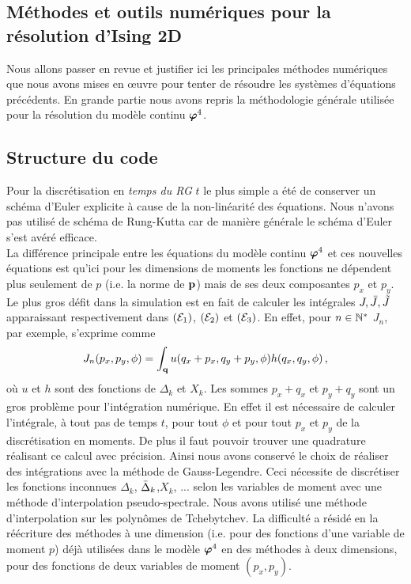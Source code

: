 \documentclass[10.5pt]{article}
\begin{document}
\begin{multicols}{2}
\section{Méthodes et outils numériques pour la résolution d'Ising 2D}

\label{sec:NumIsing}
Nous allons passer en revue et justifier ici les principales méthodes numériques que nous avons mises en œuvre pour tenter de résoudre les systèmes d'équations précédents. En grande partie nous avons repris la méthodologie générale utilisée pour la résolution du modèle continu $\boldsymbol{ \varphi}^4$.


\subsection{Structure du code}

Pour la discrétisation en \textit{temps du RG} $t$ le plus simple a été de conserver un schéma d'Euler explicite à cause de la non-linéarité des équations. Nous n'avons pas utilisé de schéma de Rung-Kutta car de manière générale le schéma d'Euler s'est avéré efficace.\\

La différence principale entre les équations du modèle continu $\boldsymbol{ \varphi}^4$ et ces nouvelles équations est qu'ici pour les dimensions de moments les fonctions ne dépendent plus seulement de $p$ (i.e. la norme de ${\bf p}$) mais de ses deux composantes $p_x$ et $p_y$. Le plus gros défit dans la simulation est en fait de calculer les intégrales $J, \bar{J}, \tilde{J}$ apparaissant respectivement dans $(\mathcal{E}_1)$, $(\mathcal{E}_2)$ et $(\mathcal{E}_3)$. En effet, pour $n\in\mathbb{N}^*$ $J_n$, par exemple, s'exprime comme 
\begin{equation}
	J_n(p_x, p_y, \phi) = \int_{\bf q} u(q_x+p_x, q_y+p_y, \phi) h(q_x,q_y, \phi) \, ,
\end{equation}
où $u$ et $h$ sont des fonctions de $\Delta_k$ et $X_k$. Les sommes $p_x+q_x$ et $p_y+q_y$ sont un gros problème pour l'intégration numérique. En effet il est nécessaire de calculer l'intégrale, à tout pas de temps $t$, pour tout $\phi$ et pour tout $p_x$ et $p_y$ de la discrétisation en moments. De plus il faut pouvoir trouver une quadrature réalisant ce calcul avec précision. Ainsi nous avons conservé le choix de réaliser des intégrations avec la méthode de Gauss-Legendre. Ceci nécessite de discrétiser les fonctions inconnues $\Delta_k$, $\bar{\Delta}_k$,$X_k$, ... selon les variables de moment avec une méthode d'interpolation pseudo-spectrale. Nous avons utilisé une méthode d'interpolation sur les polynômes de Tchebytchev. La difficulté a résidé en la réécriture des méthodes à une dimension (i.e. pour des fonctions d'une variable de moment $p$) déjà utilisées dans le modèle $ \boldsymbol{ \varphi}^4$ en des méthodes à deux dimensions, pour des fonctions de deux variables de moment $(p_x, p_y)$. 


\end{multicols}
\end{document}
